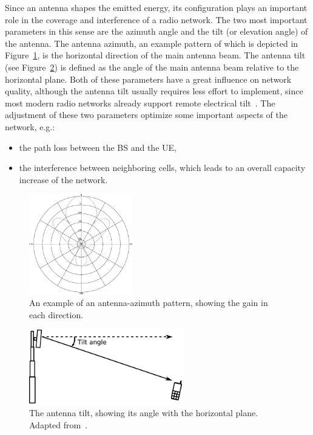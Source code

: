 Since an antenna shapes the emitted energy, its configuration plays
an important role in the coverage and interference of a radio network.
The two most important parameters in this sense are the azimuth angle
and the tilt (or elevation angle) of the antenna. The antenna azimuth,
an example pattern of which is depicted in Figure~\ref{fig:02-Antenna_azimuth},
is the horizontal direction of the main antenna beam. The antenna
tilt (see Figure~\ref{fig:02-Antenna-tilt}) is defined as the angle
of the main antenna beam relative to the horizontal plane. Both of
these parameters have a great influence on network quality, although
the antenna tilt usually requires less effort to implement, since
most modern radio networks already support remote electrical tilt~\cite{Athley-Impact_of_electrical_tilt_on_LTE_performance:2010}.
The adjustment of these two parameters optimize some important aspects
of the network, e.g.:
\begin{itemize}
\item the path loss between the BS and the UE,
\item the interference between neighboring cells, which leads to an overall
capacity increase of the network.
\end{itemize}
\begin{figure}[h]
\centering

\includegraphics[width=0.4\textwidth]{02-background_and_motivation/img/antenna_pattern}

\caption{An example of an antenna-azimuth pattern, showing the gain in each
direction.\label{fig:02-Antenna_azimuth}}
\end{figure}


\begin{figure}
\centering

\includegraphics[width=0.6\textwidth]{02-background_and_motivation/img/antenna_tilt}

\caption{The antenna tilt, showing its angle with the horizontal plane. Adapted
from~\cite{WCDMAforUMTS_RadioAccessForThirdGenerationMobileCommunications}.\label{fig:02-Antenna-tilt}}
\end{figure}



